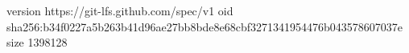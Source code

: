 version https://git-lfs.github.com/spec/v1
oid sha256:b34f0227a5b263b41d96ae27bb8bde8e68cbf3271341954476b043578607037e
size 1398128
